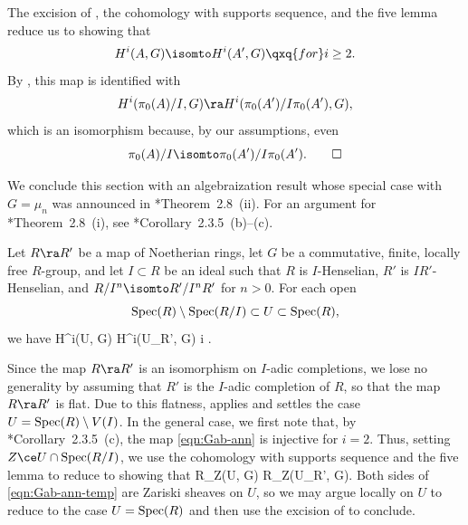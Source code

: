 \bpf
The excision of , the cohomology with supports sequence, and the five lemma reduce us to showing that
\[
H^i(A, G) \isomto H^i(A', G) \qxq{for} i \ge 2.
\]
By , this map is identified with
\[
H^i(\pi_0(A)/I, G) \ra H^i(\pi_0(A')/I\pi_0(A'), G),
\]
which is an isomorphism because, by our assumptions, even
\[
\pi_0(A)/I \isomto \pi_0(A')/I\pi_0(A').\qedhere
\]
\epf



We conclude this section with an algebraization result whose special case with $G = \mu_n$ was announced in \cite{Gab93}*{Theorem~2.8~(ii)}. For an argument for \cite{Gab93}*{Theorem~2.8~(i)}, see \cite{BC19}*{Corollary~2.3.5~(b)--(c)}.


\bcor\label{cor:Gab-ann}
Let $R \ra R'$ be a map  of Noetherian rings, let $G$ be a commutative, finite, locally free $R$-group, and let $I \subset R$ be an ideal such that $R$ is $I$-Henselian, $R'$ is $IR'$-Henselian, and $R/I^n \isomto R'/I^nR'$ for $n > 0$. For each open
\[
\operatorname{Spec}(R)\setminus \operatorname{Spec}(R/I) \subset U \subset \operatorname{Spec}(R),
\]
we have
\be \label{eqn:Gab-ann}
H^i(U, G) \isomto H^i(U_{R'}, G)  i .
\ee
\ecor

\bpf
Since the map $R \ra R'$ is an isomorphism on $I$-adic completions, we lose no generality by assuming that $R'$ is the $I$-adic completion of $R$, so that the map $R \ra R'$ is flat. Due to this flatness,  applies and settles the case $U = \operatorname{Spec}(R) \setminus V(I)$. In the general case, we first note that, by \cite{BC19}*{Corollary~2.3.5~(c)}, the map \eqref{eqn:Gab-ann} is injective for $i = 2$. Thus, setting $Z \ce U \cap \Spec(R/I)$, we use the cohomology with supports sequence and the five lemma to reduce to showing that
\be \label{eqn:Gab-ann-temp}
R\Gamma_Z(U, G) \isomto R\Gamma_Z(U_{R'}, G).
\ee
Both sides of \eqref{eqn:Gab-ann-temp} are Zariski sheaves on $U$, so we may argue locally on $U$ to reduce to the case $U = \operatorname{Spec}(R)$ and then use the excision of    to conclude.
\epf

















